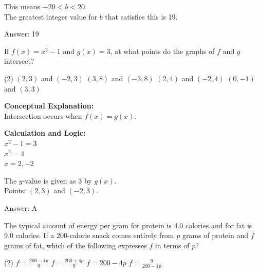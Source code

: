 \documentclass[11pt,paper=a4,answers]{exam}
\begin{document}
\begin{questions}
\begin{solution}
\vspace{10pt}

This means $-20 < b < 20$. \\
The greatest integer value for $b$ that satisfies this is 19.

\vspace{25pt}

Answer: \colorbox{yellow!100}{19}
\end{solution}

\vspace{40pt}

\question
If $f(x) = x^2 - 1$ and $g(x) = 3$, at what points do the graphs of $f$ and $g$ intersect?
\begin{tasks}(2)
    \task $(2, 3)$ and $(-2, 3)$
    \task $(3, 8)$ and $(-3, 8)$
    \task $(2, 4)$ and $(-2, 4)$
    \task $(0, -1)$ and $(3, 3)$
\end{tasks}

\begin{solution}
\textbf{Conceptual Explanation:} \\
Intersection occurs when $f(x) = g(x)$.

\vspace{20pt}

\textbf{Calculation and Logic:} \\
$x^2 - 1 = 3$ \\
$x^2 = 4$ \\
$x = 2, -2$

\vspace{10pt}

The $y$-value is given as 3 by $g(x)$. \\
Points: $(2, 3)$ and $(-2, 3)$.

\vspace{25pt}

Answer: \colorbox{yellow!100}{A}
\end{solution}

\vspace{40pt}

\question
The typical amount of energy per gram for protein is 4.0 calories and for fat is 9.0 calories. If a 200-calorie snack comes entirely from $p$ grams of protein and $f$ grams of fat, which of the following expresses $f$ in terms of $p$?
\begin{tasks}(2)
    \task $f = \frac{200 - 4p}{9}$
    \task $f = \frac{200 + 4p}{9}$
    \task $f = 200 - 4p$
    \task $f = \frac{9}{200 - 4p}$
\end{tasks}


\end{questions}
\end{document}
